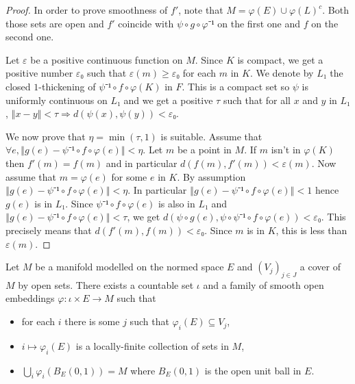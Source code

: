 \begin{proof}
  In order to prove smoothness of $f'$, note that $M = φ(E) ∪ φ(L)^c$. Both
  those sets are open and $f'$ coincide with $ψ ∘ g ∘ φ⁻¹$ on the first one and
  $f$ on the second one.

  Let $ε$ be a positive continuous function on $M$. Since $K$ is compact, we get
  a positive number $ε₀$ such that $ε(m) ≥ ε₀$ for each $m$ in $K$. We denote by
  $L₁$ the closed $1$-thickening of $ψ⁻¹∘f∘φ(K)$ in $F$. This is a compact set
  so $ψ$ is uniformly continuous on $L₁$ and we get a positive $τ$ such that
  for all $x$ and $y$ in $L₁$, $‖x - y‖ < τ ⇒ d(ψ(x), ψ(y)) < ε₀$.

  We now prove that $η = \min(τ, 1)$ is suitable. Assume that
  $∀ e, ‖g(e) - ψ⁻¹∘f∘φ(e)‖ < η$. Let $m$ be a point in $M$. If $m$ isn't in
  $φ(K)$ then $f'(m) = f(m)$ and in particular $d(f(m), f'(m)) < ε(m)$. Now
  assume that $m = φ(e)$ for some $e$ in $K$. By assumption $‖g(e) - ψ⁻¹∘f∘φ(e)‖ < η$.
  In particular $‖g(e) - ψ⁻¹∘f∘φ(e)‖ < 1$ hence $g(e)$ is in $L₁$. Since
  $ψ⁻¹∘f∘φ(e)$ is also in $L₁$ and $‖g(e) - ψ⁻¹∘f∘φ(e)‖ < τ$, we get
  $d(ψ∘ g(e), ψ ∘ ψ⁻¹∘f∘φ(e)) < ε₀$. This precisely means that
  $d(f'(m), f(m)) < ε₀$. Since $m$ is in $K$, this is less than $ε(m)$.
\end{proof}

\begin{lemma}
  \label{lem:nice_atlas}
  Let $M$ be a manifold modelled on the normed space $E$ and $(V_j)_{j ∈ J}$
  a cover of $M$ by open sets. There exists a countable set $ι$ and
  a family of smooth open embeddings $φ : ι × E → M$ such that
  \begin{itemize}
    \item for each $i$ there is some $j$ such that $φ_i(E) \subseteq V_j$,
    \item $i ↦ φ_i(E)$ is a locally-finite collection of sets in $M$,
    \item $⋃_i φ_i(B_E(0, 1)) = M$ where $B_E(0, 1)$ is the open unit ball in $E$.
  \end{itemize}
\end{lemma}

